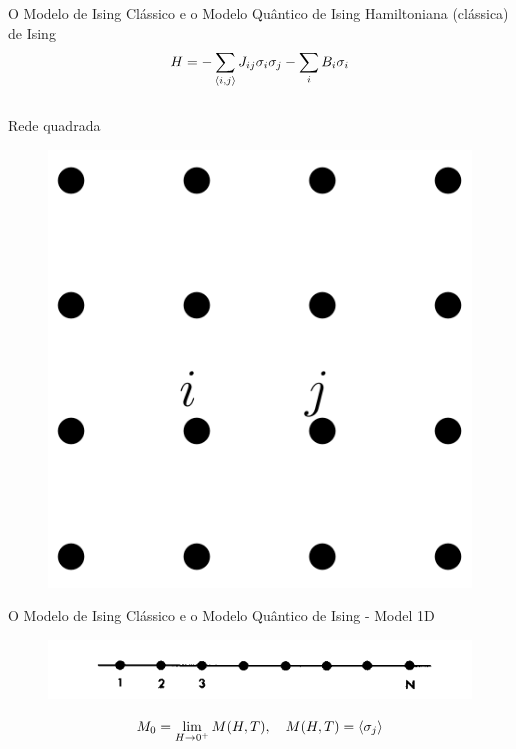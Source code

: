 \documentclass[10pt]{beamer}
\begin{document}
\begin{frame}{O Modelo de Ising Clássico e o Modelo Quântico de Ising}
	Hamiltoniana (clássica) de Ising
	\begin{equation*}
		H = - \sum_{\ev{i,j}} J_{ij} \sigma_i \sigma_j - \sum_i B_i \sigma_i 
	\end{equation*}
	\\
	Rede quadrada
	\begin{figure}[h]
		\center
		\includegraphics[scale=.2]{rede2d.png}	
	\end{figure}

\end{frame}

\begin{frame}{O Modelo de Ising Clássico e o Modelo Quântico de Ising}
	- Model 1D 
	\begin{figure}[h]
		\center
		\includegraphics[scale=.3]{1dIsing.png}
	\end{figure}
	
	\begin{equation*}
		M_0 = \lim_{H \to 0^+} M(H, T) \qc M(H,T) = \ev{ \sigma_j }
	\end{equation*}
	
\end{frame}
\end{document}
